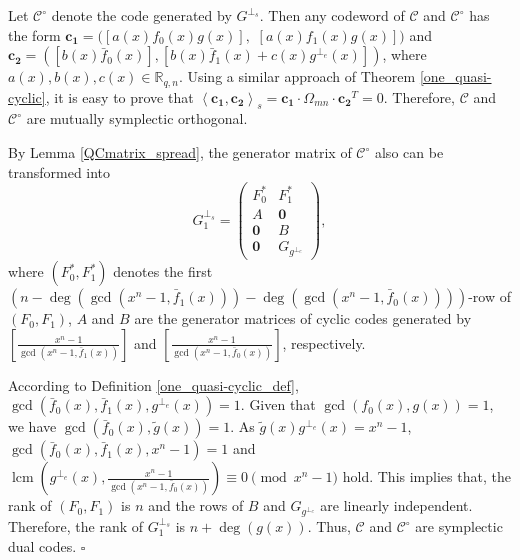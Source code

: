 \documentclass[10pt,a4paper]{amsart}
\newenvironment{proof}{{\noindent\it Proof:} }{\hfill $\square$\par}
\begin{document}
\begin{proof}
	 Let $\mathscr{C}^{\circ}$ denote the code generated by $G^{\perp_{s}}$.  
 Then any codeword of $\mathscr{C}$ and $\mathscr{C}^{\circ}$ has the form $\mathbf{c_{1}}=(\left[a(x) f_{0}(x) g(x)\right],$ $\left[a(x) f_{1}(x) g(x)\right])$ and $\mathbf{c_{2}}=(\left[b(x) \bar{f}_{0}(x)\right],\left[b(x) \bar{f}_{1}(x)+c(x)g^{\perp_e}(x)\right])$, where $a(x),b(x),c(x)\in\mathbb{R}_{q,n}$. 
	Using a similar approach of Theorem \ref{one_quasi-cyclic}, it is easy to prove that $\left\langle \mathbf{c_{1}}, \mathbf{c_{2}}\right\rangle_{s}=\mathbf{c_{1}} \cdot \Omega _{mn} \cdot \mathbf{c_{2}}^{T}=0$.
	Therefore, $\mathscr{C}$ and $\mathscr{C}^{\circ}$ are mutually symplectic orthogonal.


 		By Lemma \ref{QCmatrix_spread}, the generator matrix of $\mathscr{C}^{\circ}$ also can be transformed into 
\begin{equation}
	G_1^{\perp_{s}}=
	\begin{pmatrix}
		F_{0}^{*}	& F_{1}^{*}\\
		A	& \mathbf{0}\\
		\mathbf{0}	& B\\
		\mathbf{0}&G_{g^{\perp_e}}
	\end{pmatrix},
\end{equation}
 		where $(F_{0}^{*},F_1^{*})$ denotes the first $(n-\deg(\gcd(x^n-1,\bar{f}_1(x)))-\deg(\gcd(x^n-1,\bar{f}_{0}(x))))$-row of $(F_{0},F_1)$, $A$ and $B$ are the generator matrices of cyclic codes generated by $\left[  \frac{x^n-1}{\gcd(x^n-1,\bar{f}_{1}(x))}\right]$ and $\left[ \frac{x^n-1}{\gcd(x^n-1,\bar{f}_{0}(x))}\right]$, respectively.
 		
 		According to Definition \ref{one_quasi-cyclic_def}, $\gcd(\bar{f}_{0}(x),\bar{f}_{1}(x),g^{\perp_e}(x))=1$. Given that $\gcd(f_0(x),g(x))=1$, we have $\gcd(\bar{f}_0(x),\tilde{g}(x) )=1$. As $\tilde{g}(x)g^{\perp_e}(x)=x^n-1$,  $\gcd(\bar{f}_{0}(x),\bar{f}_{1}(x),x^n-1)=1$ and $\operatorname{lcm}\left(g^{\perp_e}(x),\frac{x^n-1}{\gcd(x^n-1,\bar{f}_{0}(x))}\right) \equiv 0 \pmod{x^n-1}$ hold. This implies that, the rank of $(F_{0}, F_{1})$ is $n$ and the rows of $B$ and $G_{g^{\perp_e}}$ are linearly independent. Therefore, the rank of $G_1^{\perp_{s}}$ is $n+\deg(g(x))$. Thus, $\mathscr{C}$ and $\mathscr{C}^{\circ}$ are symplectic dual codes.
\end{proof}
\end{document}

